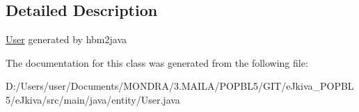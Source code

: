 \subsection{Detailed Description}
\mbox{\hyperlink{classentity_1_1_user}{User}} generated by hbm2java 

The documentation for this class was generated from the following file\+:\begin{DoxyCompactItemize}
\item 
D\+:/\+Users/user/\+Documents/\+M\+O\+N\+D\+R\+A/3.\+M\+A\+I\+L\+A/\+P\+O\+P\+B\+L5/\+G\+I\+T/e\+Jkiva\+\_\+\+P\+O\+P\+B\+L5/e\+Jkiva/src/main/java/entity/User.\+java\end{DoxyCompactItemize}
